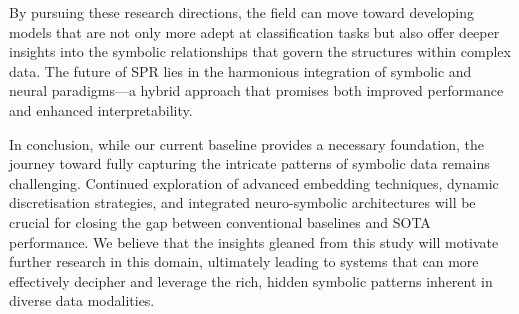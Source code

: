 \documentclass{article}
\begin{document}
By pursuing these research directions, the field can move toward developing models that are not only more adept at classification tasks but also offer deeper insights into the symbolic relationships that govern the structures within complex data. The future of SPR lies in the harmonious integration of symbolic and neural paradigms—a hybrid approach that promises both improved performance and enhanced interpretability.

In conclusion, while our current baseline provides a necessary foundation, the journey toward fully capturing the intricate patterns of symbolic data remains challenging. Continued exploration of advanced embedding techniques, dynamic discretisation strategies, and integrated neuro-symbolic architectures will be crucial for closing the gap between conventional baselines and SOTA performance. We believe that the insights gleaned from this study will motivate further research in this domain, ultimately leading to systems that can more effectively decipher and leverage the rich, hidden symbolic patterns inherent in diverse data modalities.
\end{document}
